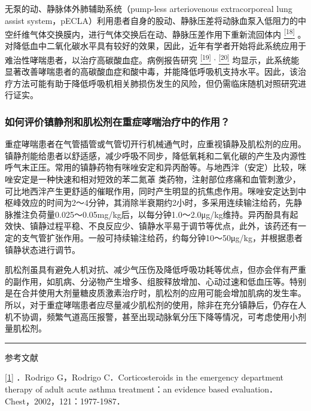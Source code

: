 无泵的动、静脉体外肺辅助系统（pump-less arteriovenous extracorporeal
lung assist
system，pECLA）利用患者自身的股动、静脉压差将动脉血泵入低阻力的中空纤维气体交换膜内，进行气体交换后在动、静脉压差作用下重新流回体内
\protect\hyperlink{text00013.htmlux5cux23ch18-12}{\textsuperscript{{[}18{]}}}
。对降低血中二氧化碳水平具有较好的效果，因此，近年有学者开始将此系统应用于难治性哮喘患者，以治疗高碳酸血症。病例报告研究
\protect\hyperlink{text00013.htmlux5cux23ch19-12}{\textsuperscript{{[}19{]}}}
\textsuperscript{,}
\protect\hyperlink{text00013.htmlux5cux23ch20-12}{\textsuperscript{{[}20{]}}}
均显示，此系统能显著改善哮喘患者的高碳酸血症和酸中毒，并能降低呼吸机支持水平。因此，该治疗方法可能有助于降低呼吸机相关肺损伤发生的风险，但仍需临床随机对照研究进行证实。

\subsubsection{如何评价镇静剂和肌松剂在重症哮喘治疗中的作用？}

重症哮喘患者在气管插管或气管切开行机械通气时，应重视镇静及肌松剂的应用。镇静剂能给患者以舒适感，减少呼吸不同步，降低氧耗和二氧化碳的产生及内源性呼气末正压。常用的镇静药物有咪唑安定和异丙酚等。与地西泮（安定）比较，咪唑安定是一种快速和相对短效的苯二氮䓬
类药物，注射部位疼痛和血管刺激少，可比地西泮产生更舒适的催眠作用，同时产生明显的抗焦虑作用。咪唑安定达到中枢峰效应的时间为2～4分钟，其消除半衰期约2小时，多采用连续输注给药，先静脉推注负荷量0.025～0.05mg/kg后，以每分钟1.0～2.0μg/kg维持。异丙酚具有起效快、镇静过程平稳、不良反应少、镇静水平易于调节等优点，此外，该药还有一定的支气管扩张作用。一般可持续输注给药，约每分钟10～50μg/kg，并根据患者镇静状态进行调节。

肌松剂虽具有避免人机对抗、减少气压伤及降低呼吸功耗等优点，但亦会伴有严重的副作用，如肌病、分泌物产生增多、组胺释放增加、心动过速和低血压等。特别是在合并使用大剂量糖皮质激素治疗时，肌松剂的应用可能会增加肌病的发生率。所以，对于重症哮喘患者应尽量减少肌松剂的使用，除非在充分镇静后，仍存在人机不协调，频繁气道高压报警，甚至出现动脉氧分压下降等情况，可考虑使用小剂量肌松剂。

\begin{center}\rule{0.5\linewidth}{\linethickness}\end{center}

参考文献

\protect\hyperlink{text00013.htmlux5cux23ch1-12-back}{{[}1{]}} ．Rodrigo
G，Rodrigo C．Corticosteroids in the emergency department therapy of
adult acute asthma treatment：an evidence based
evaluation．Chest，2002，121：1977-1987．

